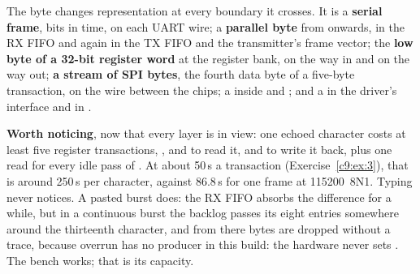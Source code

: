 The byte changes representation at every boundary it crosses. It is a \textbf{serial frame}, bits
in time, on each UART wire; a \textbf{parallel byte} from  onwards, in the RX FIFO and
again in the TX FIFO and the transmitter's frame vector; the \textbf{low byte of a 32-bit register
word} at the register bank,  on the way in and  on the way out;
\textbf{a stream of SPI bytes}, the fourth data byte of a five-byte transaction, on the wire between
the chips; a  inside  and ; and a  in the
driver's interface and in .

\textbf{Worth noticing}, now that every layer is in view: one echoed character costs at least five
register transactions, ,  and  to read it,  and
 to write it back, plus one  read for every idle pass of . At
about 50\,\textmu s a transaction (Exercise~\ref{c9:ex:3}), that is around 250\,\textmu s per
character, against 86.8\,\textmu s for one frame at 115200~8N1. Typing never notices. A pasted burst
does: the RX FIFO absorbs the difference for a while, but in a continuous burst the backlog passes
its eight entries somewhere around the thirteenth character, and from there bytes are dropped
without a trace, because overrun has no producer in this build: the hardware never sets
. The bench works; that is its capacity.
